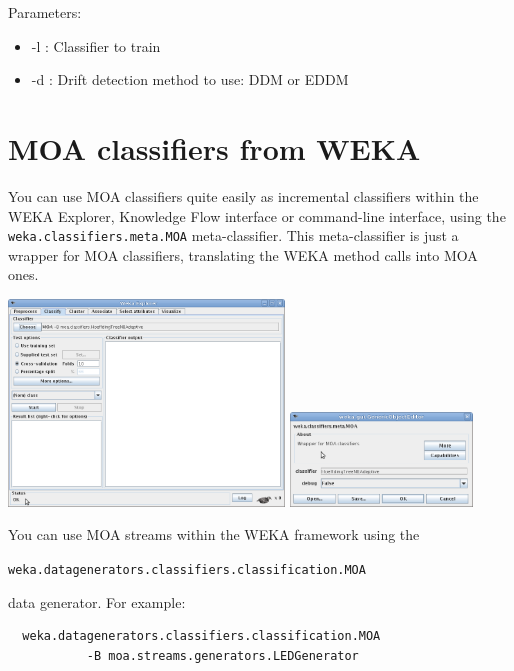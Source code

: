 \documentclass[a4paper,12pt,twoside]{book}
\begin{document}
Parameters:
\begin{itemize}
\item -l : Classifier to train
\item -d : Drift detection method to use: DDM or EDDM
\end{itemize}

\section{MOA classifiers from WEKA}

You can use MOA classifiers quite easily as incremental classifiers within the
WEKA Explorer, Knowledge Flow interface or command-line interface, using the \texttt{weka.classifiers.meta.MOA} meta-classifier.
This meta-classifier is just a wrapper for MOA classifiers, translating the
WEKA method calls into MOA ones.

\begin{center}
\includegraphics[height=5.5cm]{figures/Screenshot-WekaE.png}
\includegraphics[height=2.5cm]{figures/Screenshot-weka.png}
\end{center}

You can use MOA streams within the WEKA framework using the 

\texttt{weka.datagenerators.classifiers.classification.MOA}
\vspace{.2cm}

data generator.
For example:
\begin{footnotesize}\begin{verbatim}
  weka.datagenerators.classifiers.classification.MOA 
           -B moa.streams.generators.LEDGenerator
\end{verbatim}\end{footnotesize}
\end{document}
